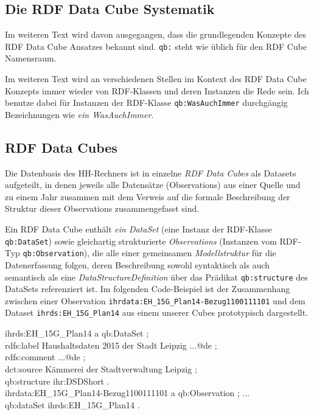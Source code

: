 \documentclass[a4paper,11pt,twoside]{article}
\begin{document}
\subsection{Die RDF Data Cube Systematik}

Im weiteren Text wird davon ausgegangen, dass die grundlegenden Konzepte des
RDF Data Cube Ansatzes \cite{RDF-Cube} bekannt sind.  \texttt{qb:} steht wie
üblich für den RDF Cube Namensraum.

Im weiteren Text wird an verschiedenen Stellen im Kontext des RDF Data Cube
Konzepts immer wieder von RDF-Klassen und deren Instanzen die Rede sein.  Ich
benutze dabei für Instanzen der RDF-Klasse \texttt{qb:WasAuchImmer}
durchgängig Bezeichnungen wie \emph{ein WasAuch\-Immer}.

\subsection{RDF Data Cubes}

Die Datenbasis des HH-Rechners ist in einzelne \emph{RDF Data Cubes} als
Datasets aufgeteilt, in denen jeweils alle Datensätze (Observations) aus einer
Quelle und zu einem Jahr zusammen mit dem Verweis auf die formale Beschreibung
der Struktur dieser Observations zusammengefasst sind.

Ein RDF Data Cube enthält \emph{ein DataSet} (eine Instanz der RDF-Klasse
\texttt{qb:DataSet}) sowie gleichartig strukturierte \emph{Observations}
(Instanzen vom RDF-Typ \texttt{qb:Observation}), die alle einer gemeinsamen
\emph{Modellstruktur} für die Datenerfassung folgen, deren Beschreibung sowohl
syntaktisch als auch semantisch als eine \emph{DataStructureDefinition} über
das Prädikat \texttt{qb:structure} des DataSets referenziert ist.  Im folgenden
Code-Beispiel ist der Zusammenhang zwischen einer Observation
\texttt{ihrdata:EH\_15G\_Plan14-Bezug1100111101} und dem Dataset
\texttt{ihrds:EH\_15G\_Plan14} aus einem unserer Cubes prototypisch
dargestellt.
\begin{code}
ihrds:EH\_15G\_Plan14 a qb:DataSet ;\+\\
  rdfs:label {\dq}Haushaltsdaten 2015 der Stadt Leipzig ...{\dq}@de ;\\
  rdfs:comment {\dq}...{\dq}@de ;\\
  dct:source {\dq}Kämmerei der Stadtverwaltung Leipzig{\dq} ;\\
  qb:structure ihr:DSDShort .\-\\[6pt]
ihrdata:EH\_15G\_Plan14-Bezug1100111101 a qb:Observation ; ... \+\\
  qb:dataSet ihrds:EH\_15G\_Plan14 . 
\end{code}
\end{document}
